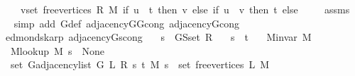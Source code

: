 \begin{isabellebody}
\ \ \ \ \ {\isacharparenleft}{\kern0pt}{\isasymUnion}v{\isasymin}set\ {\isacharparenleft}{\kern0pt}free{\isacharunderscore}{\kern0pt}vertices\ R\ M{\isacharparenright}{\kern0pt}{\isachardot}{\kern0pt}\ if\ u\ {\isacharequal}{\kern0pt}\ t\ then\ {\isacharbraceleft}{\kern0pt}v{\isacharbraceright}{\kern0pt}\ else\ if\ u\ {\isacharequal}{\kern0pt}\ v\ then\ {\isacharbraceleft}{\kern0pt}t{\isacharbraceright}{\kern0pt}\ else\ {\isacharbraceleft}{\kern0pt}{\isacharbraceright}{\kern0pt}{\isacharparenright}{\kern0pt}{\isachardoublequoteclose}%
\endisataginvisible
{\isafoldinvisible}%
%
\isadeliminvisible
\isanewline
%
\endisadeliminvisible
%
\isadelimproof
\ \ %
\endisadelimproof
%
\isatagproof
{}\isamarkupfalse%
\ assms\isanewline
\ \ \isamarkupfalse%
\ {\isacharparenleft}{\kern0pt}simp\ add{\isacharcolon}{\kern0pt}\ G{}{\isacharunderscore}{\kern0pt}def\ adjacency{\isacharunderscore}{\kern0pt}G{}{\isacharunderscore}{\kern0pt}{}{\isacharunderscore}{\kern0pt}G{}{\isacharunderscore}{\kern0pt}{}{\isacharunderscore}{\kern0pt}cong\ adjacency{\isacharunderscore}{\kern0pt}G{}{\isacharunderscore}{\kern0pt}{}{\isacharunderscore}{\kern0pt}cong{\isacharparenright}{\kern0pt}%
\endisatagproof
{\isafoldproof}%
%
\isadelimproof
\isanewline
%
\endisadelimproof
%
\isadeliminvisible
\isanewline
%
\endisadeliminvisible
%
\isataginvisible
{}\isamarkupfalse%
\ {\isacharparenleft}{\kern0pt}\ edmonds{\isacharunderscore}{\kern0pt}karp{\isacharparenright}{\kern0pt}\ adjacency{\isacharunderscore}{\kern0pt}G{}{\isacharunderscore}{\kern0pt}s{\isacharunderscore}{\kern0pt}cong{\isacharcolon}{\kern0pt}\isanewline
\ \ \ {\isachardoublequoteopen}s\ {\isasymnotin}\ G{\isachardot}{\kern0pt}S{\isachardot}{\kern0pt}set\ R{\isachardoublequoteclose}\isanewline
\ \ \ {\isachardoublequoteopen}s\ {\isasymnoteq}\ t{\isachardoublequoteclose}\isanewline
\ \ \ {\isachardoublequoteopen}M{\isachardot}{\kern0pt}invar\ M{\isachardoublequoteclose}\isanewline
\ \ \ {\isachardoublequoteopen}M{\isacharunderscore}{\kern0pt}lookup\ M\ s\ {\isacharequal}{\kern0pt}\ None{\isachardoublequoteclose}\isanewline
\ \ \ {\isachardoublequoteopen}set\ {\isacharparenleft}{\kern0pt}G{\isachardot}{\kern0pt}adjacency{\isacharunderscore}{\kern0pt}list\ {\isacharparenleft}{\kern0pt}G{}\ L\ R\ s\ t\ M{\isacharparenright}{\kern0pt}\ s{\isacharparenright}{\kern0pt}\ {\isacharequal}{\kern0pt}\ set\ {\isacharparenleft}{\kern0pt}free{\isacharunderscore}{\kern0pt}vertices\ L\ M{\isacharparenright}{\kern0pt}{\isachardoublequoteclose}%

\end{isabellebody}
